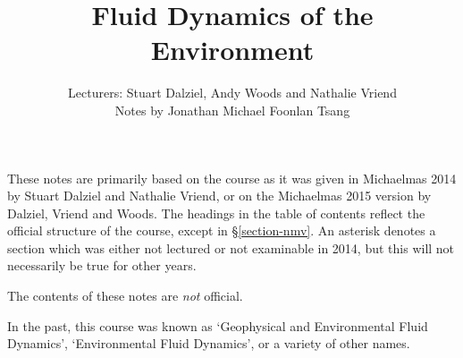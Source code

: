 \documentclass{book}
\title{Fluid Dynamics of the Environment}
\author{
    Lecturers: Stuart Dalziel, Andy Woods and Nathalie Vriend \\ 
Notes by Jonathan Michael Foonlan Tsang}
\numberwithin{equation}{section}
\begin{document}
\maketitle

These notes are primarily based on the course as it was given in Michaelmas 2014
by Stuart Dalziel and Nathalie Vriend, or on the Michaelmas 2015 version by
Dalziel, Vriend and Woods. The headings in the table of contents reflect
the official structure of the course, except in \S\ref{section-nmv}. An asterisk
denotes a section which was either not lectured or not examinable in 2014, but
this will not necessarily be true for other years. 

The contents of these notes are \textit{not} official.

In the past, this course was known as `Geophysical and Environmental Fluid
Dynamics', `Environmental Fluid Dynamics', or a variety of other names.

\tableofcontents















\end{document}
